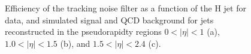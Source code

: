 \begin{figure}[!htb]
\centering
{}
\caption{Efficiency of the tracking noise filter as a function of the H jet \pt for data, and simulated signal and QCD background
for jets reconstructed in the pseudorapidty regions $0 < |\eta| < 1$ (a), $1.0 < |\eta| < 1.5$ (b), and $1.5 < |\eta| < 2.4$ (c).}
\label{fig:eff-pt-filters-eta1}
\end{figure}

